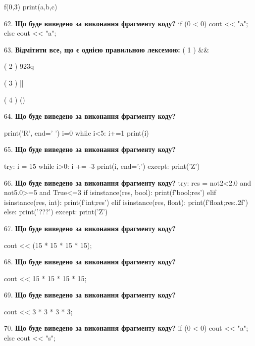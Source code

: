 \documentclass[11pt]{article}
\begin{document}
f(0,3)
print(a,b,c)
\par\vspace{5mm}
62. \textbf{Що буде виведено за виконання фрагменту коду?}
if (0 < 0)
    cout << "a";
else
    cout << "a";

\par\vspace{5mm}
63. %
\textbf{Відмітити все, що є однією правильною лексемою:}
( 1 ) &&

( 2 ) 923q

( 3 ) ||

( 4 ) ()
\par\vspace{5mm}
64. \textbf{Що буде виведено за виконання фрагменту коду?}

print('R', end=' ')
i=0
while i<5:
    i+=1
print(i)

\par\vspace{5mm}
65. \textbf{Що буде виведено за виконання фрагменту коду?}

try:
    i = 15
    while i>0:
        i += -3
    print(i, end=';')
except:
    print('Z')

\par\vspace{5mm}
66. \textbf{Що буде виведено за виконання фрагменту коду?}
try:
    res = not2<2.0 and not5.0>=5 and True<=3
    if isinstance(res, bool):
        print(f'bool;{res}')
    elif isinstance(res, int):
        print(f'int;{res}')
    elif isinstance(res, float):
        print(f'float;{res:.2f}')
    else:
        print('???')
except:
    print('Z')
\par\vspace{5mm}
67. \textbf{Що буде виведено за виконання фрагменту коду?}

cout << (15 * 15 * 15 * 15);
\par\vspace{5mm}
68. \textbf{Що буде виведено за виконання фрагменту коду?}

cout << 15 * 15 * 15 * 15;
\par\vspace{5mm}
69. \textbf{Що буде виведено за виконання фрагменту коду?}

cout << 3 * 3 * 3 * 3;
\par\vspace{5mm}
70. \textbf{Що буде виведено за виконання фрагменту коду?}
if (0 < 0)
    cout << "a";
else
    cout << "s";
\end{document}
